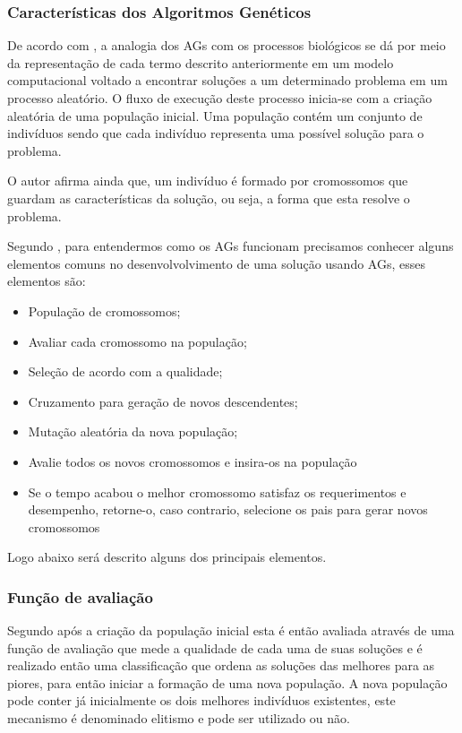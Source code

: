 \subsubsection{Características dos Algoritmos Genéticos}

\par De acordo com , a analogia dos AGs com
os processos biológicos se dá por meio da representação de cada termo descrito
anteriormente em um modelo computacional voltado a encontrar soluções a um
determinado problema em um processo aleatório. O fluxo de execução deste processo
inicia-se com a criação aleatória de uma população inicial. Uma população contém
um conjunto de indivíduos sendo que cada indivíduo  representa uma possível solução
para o problema.

\par O autor afirma ainda que, um indivíduo é formado por cromossomos que
guardam as características da solução, ou seja, a forma que esta resolve o
problema.

\par Segundo , para
entendermos como os AGs funcionam precisamos conhecer alguns
elementos comuns no desenvolvolvimento de uma solução usando AGs, esses
elementos são:
\begin{itemize}
\item População de cromossomos;
\item Avaliar cada cromossomo na população;
\item Seleção de acordo com a qualidade;
\item Cruzamento para geração de novos descendentes;
\item Mutação aleatória da nova população;
\item Avalie todos os novos cromossomos e insira-os na população
\item Se o tempo acabou o melhor cromossomo satisfaz os requerimentos e
desempenho, retorne-o, caso contrario, selecione os pais para gerar novos
cromossomos
\end{itemize}
\par Logo abaixo será descrito alguns dos principais elementos.

\subsubsection{Função de avaliação}

\par Segundo  após a criação da população
inicial esta é então avaliada através de uma função de avaliação que mede a qualidade de cada uma de suas soluções e é
realizado então uma classificação que ordena as soluções das melhores para as
piores, para então iniciar a formação de uma nova população. A nova população
pode conter já inicialmente os dois melhores indivíduos existentes, este
mecanismo é denominado elitismo e pode ser utilizado ou não.

